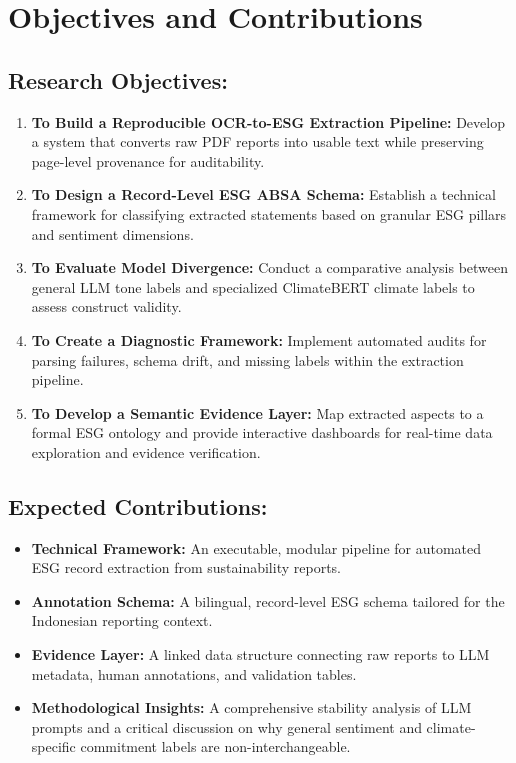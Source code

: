 \section{Objectives and Contributions}
\subsection{Research Objectives:}
\begin{enumerate}
\item 

\textbf{To Build a Reproducible OCR-to-ESG Extraction Pipeline:} Develop a system that converts raw PDF reports into usable text while preserving page-level provenance for auditability.\item 

\textbf{To Design a Record-Level ESG ABSA Schema:} Establish a technical framework for classifying extracted statements based on granular ESG pillars and sentiment dimensions.\item 

\textbf{To Evaluate Model Divergence:} Conduct a comparative analysis between general LLM tone labels and specialized ClimateBERT climate labels to assess construct validity.\item 

\textbf{To Create a Diagnostic Framework:} Implement automated audits for parsing failures, schema drift, and missing labels within the extraction pipeline.\item 

\textbf{To Develop a Semantic Evidence Layer:} Map extracted aspects to a formal ESG ontology and provide interactive dashboards for real-time data exploration and evidence verification.
\end{enumerate}
\subsection{Expected Contributions:}
\begin{itemize}
\item 

\textbf{Technical Framework:} An executable, modular pipeline for automated ESG record extraction from sustainability reports.\item 

\textbf{Annotation Schema:} A bilingual, record-level ESG schema tailored for the Indonesian reporting context.\item 

\textbf{Evidence Layer:} A linked data structure connecting raw reports to LLM metadata, human annotations, and validation tables.\item 

\textbf{Methodological Insights:} A comprehensive stability analysis of LLM prompts and a critical discussion on why general sentiment and climate-specific commitment labels are non-interchangeable.
\end{itemize}
